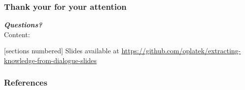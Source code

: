 \documentclass[10pt, compress,british,xcolor={svgnames,dvipsnames,x11names},trans]{beamer}
\begin{document}

\begin{frame}\frametitle{Thank your for your attention}
    {\bf \large \it Questions?} \\
    \vfill
    Content:

  [sections numbered]
  \tableofcontents
    \vfill
    {\footnotesize Slides available at \url{https://github.com/oplatek/extracting-knowledge-from-dialogue-slides}}

\end{frame}

\appendix

\begin{frame}[allowframebreaks]
        \frametitle{References}
        
        
\end{frame}
\end{document}
